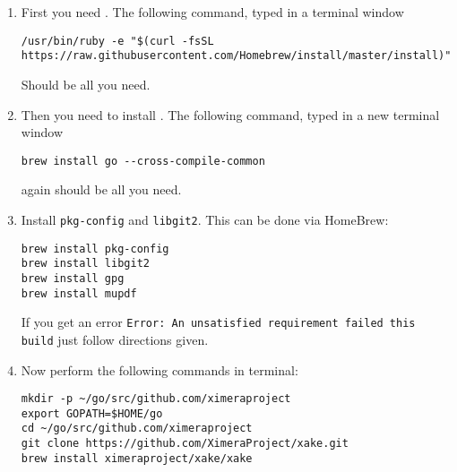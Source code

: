 \documentclass{ximera}
\begin{document}
\begin{enumerate}
\item First you need . The following command, typed in a terminal window
\begin{verbatim}
/usr/bin/ruby -e "$(curl -fsSL https://raw.githubusercontent.com/Homebrew/install/master/install)"
\end{verbatim}
Should be all you need. 
\item Then you need to install . The following command, typed in a new terminal window
\begin{verbatim}
brew install go --cross-compile-common
\end{verbatim}
again should be all you need.
\item Install \verb|pkg-config| and \verb|libgit2|. This can be done via HomeBrew:
\begin{verbatim}
brew install pkg-config
brew install libgit2
brew install gpg
brew install mupdf
\end{verbatim}
If you get an error \verb|Error: An unsatisfied requirement failed this build| just follow directions given. 


\item Now perform the following commands in terminal:
\begin{verbatim}
mkdir -p ~/go/src/github.com/ximeraproject
export GOPATH=$HOME/go
cd ~/go/src/github.com/ximeraproject
git clone https://github.com/XimeraProject/xake.git
brew install ximeraproject/xake/xake
\end{verbatim}
\end{enumerate}
\end{document}
